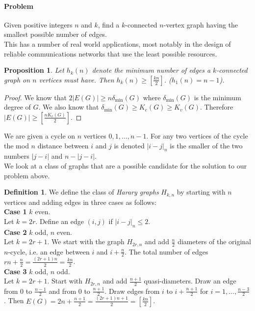\documentclass{article}
\newtheorem*{prop}{Proposition}
\theoremstyle{definition}
\newtheorem*{defn}{Definition}
\begin{document}
\paragraph{Problem} Given positive integers $n$ and $k$, find a $k$-connected $n$-vertex graph having the smallest possible number of edges. \\
This has a number of real world applications, most notably in the design of reliable communications networks that use the least possible resources.


\begin{prop}
Let $h_k(n)$ denote the minimum number of edges a $k$-connected graph on $n$ vertices must have.
Then $h_k(n) \ge \left[\frac{kn}{2}\right]$. 
($h_1(n) = n-1$).
\end{prop}

\begin{proof}
We know that $2|E(G)| \ge  n\delta_{\text{min}}(G)$ where $\delta_{\text{min}}(G)$ is the minimum degree of $G$.
We also know that $\delta_{\text{min}}(G) \ge K_e(G) \ge K_v(G)$.
Therefore $|E(G)| \ge \left[\frac{nK_v(G)}{2}\right]$.
\end{proof}

We are given a cycle on $n$ vertices $0,1,\ldots,n-1$.
For any two vertices of the cycle the mod $n$ distance between $i$ and $j$ is denoted $|i-j|_n$ is the smaller of the two numbers $|j-i|$ and $n-|j-i|$. \\
We look at a class of graphs that are a possible candidate for the solution to our problem above.

\begin{defn}
We define the class of \emph{Harary graphs} $H_{k,n}$ by starting with $n$ vertices and adding edges in three cases as follows: \\
\textbf{Case 1} $k$ even. \\
Let $k=2r$.
Define an edge $(i,j)$ if $|i-j|_n \le 2$. \\
\textbf{Case 2} $k$ odd, $n$ even. \\
Let $k=2r+1$.
We start with the graph $H_{2r,n}$ and add $\frac{n}{2}$ diameters of the original $n$-cycle, i.e. an edge between $i$ and $i+\frac{n}{2}$.
The total number of edges $rn +\frac{n}{2} = \frac{(2r+1)n}{2} = \frac{kn}{2}$.\\
\textbf{Case 3} $k$ odd, $n$ odd. \\
Let $k = 2r+1$.
Start with $H_{2r,n}$ and add $\frac{n+1}{2}$ quasi-diameters.
Draw an edge from 0 to $\frac{n-1}{2}$ and from 0 to $\frac{n+1}{2}$.
Draw edges from $i$ to $i+\frac{n+1}{2}$ for $i=1,\ldots,\frac{n-3}{2}$.
Then $E(G) = 2n + \frac{n+1}{2} = \frac{(2r+1)n+1}{2} = \left[\frac{kn}{2}\right]$.
\end{defn}
\end{document}
